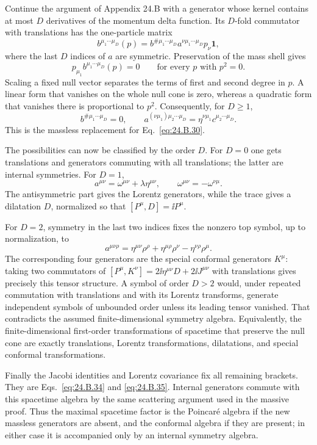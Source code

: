 \ExerciseEditorialNote

\begin{enumerate}
Continue the argument of Appendix 24.B with a generator whose kernel contains
at most \(D\) derivatives of the momentum delta function.  Its \(D\)-fold
commutator with translations has the one-particle matrix
\[
 b^{\mu_1\cdots\mu_D}(p)
 =b^{\#\mu_1\cdots\mu_D}
  a^{\nu\mu_1\cdots\mu_D}p_\nu\mathbf{1} ,
\]
where the last \(D\) indices of \(a\) are symmetric.  Preservation of the
mass shell gives
\[
 p_{\mu_1}b^{\mu_1\cdots\mu_D}(p)=0
 \qquad\text{for every }p\text{ with }p^2=0.
\]
Scaling a fixed null vector separates the terms of first and second degree in
\(p\).  A linear form that vanishes on the whole null cone is zero, whereas a
quadratic form that vanishes there is proportional to \(p^2\).  Consequently,
for \(D\geq1\),
\[
 b^{\#\mu_1\cdots\mu_D}=0,\qquad
 a^{(\nu\mu_1)\mu_2\cdots\mu_D}
 =\eta^{\nu\mu_1}c^{\mu_2\cdots\mu_D}.
\]
This is the massless replacement for Eq.~\eqref{eq:24.B.30}.

The possibilities can now be classified by the order \(D\).  For \(D=0\)
one gets translations and generators commuting with all translations; the
latter are internal symmetries.  For \(D=1\),
\[
 a^{\mu\nu}=\omega^{\mu\nu}+\lambda\eta^{\mu\nu},
 \qquad \omega^{\mu\nu}=-\omega^{\nu\mu}.
\]
The antisymmetric part gives the Lorentz generators, while the trace gives a
dilatation \(D\), normalized so that
\([P^\mu,D]=\ii P^\mu\).

For \(D=2\), symmetry in the last two indices fixes the nonzero top symbol,
up to normalization, to
\[
 a^{\mu\nu\rho}
 =\eta^{\mu\nu}\rho^\rho+\eta^{\mu\rho}\rho^\nu
  -\eta^{\nu\rho}\rho^\mu .
\]
The corresponding four generators are the special conformal generators
\(K^\mu\): taking two commutators of
\([P^\mu,K^\nu]=2\ii\eta^{\mu\nu}D+2\ii J^{\mu\nu}\)
with translations gives precisely this tensor structure.  A symbol of order
\(D>2\) would, under repeated commutation with translations and with its
Lorentz transforms, generate independent symbols of unbounded order unless
its leading tensor vanished.  That contradicts the assumed
finite-dimensional symmetry algebra.  Equivalently, the finite-dimensional
first-order transformations of spacetime that preserve the null cone are
exactly translations, Lorentz transformations, dilatations, and special
conformal transformations.

Finally the Jacobi identities and Lorentz covariance fix all remaining
brackets.  They are Eqs.~\eqref{eq:24.B.34} and
\eqref{eq:24.B.35}.  Internal generators commute with this spacetime algebra
by the same scattering argument used in the massive proof.  Thus the maximal
spacetime factor is the Poincar\'e algebra if the new massless generators are
absent, and the conformal algebra if they are present; in either case it is
accompanied only by an internal symmetry algebra.


\end{enumerate}
